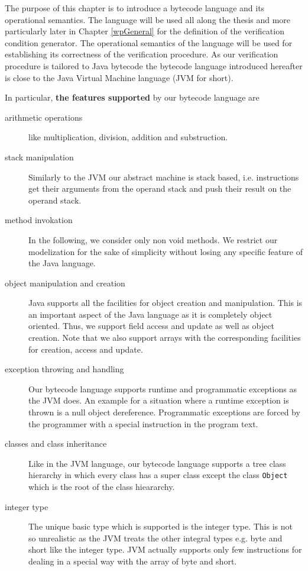 
 The purpose of this chapter is to introduce a bytecode language 
 and its operational semantics. The language will be used all along the thesis and more particularly
  later in Chapter \ref{wpGeneral} for the definition of the verification condition generator.
 The operational semantics of the language will be used 
 for establishing  its correctness of the verification procedure.
 As our verification procedure is tailored to Java bytecode 
 the bytecode language introduced hereafter is close to the Java Virtual Machine 
 language \cite{VMSpec}(JVM for short). 
 
In particular, \textbf{the features supported} by our bytecode language are 
\begin{description} 
   \item  [arithmetic operations] like multiplication, division, addition and substruction. 

   \item  [stack manipulation] Similarly to the JVM  our abstract machine is stack based, i.e. instructions
          get their arguments from the operand stack and push their result on the  operand stack.

   \item  [method invokation] In the following, we consider only  non void methods. 
          We restrict our modelization for the sake of simplicity without losing any specific feature of the Java language.
          
   \item  [object manipulation and creation] 
          Java supports all the facilities for object creation and manipulation.
	  This is an important aspect of the Java language as it is completely object oriented.
	  Thus, we support field access and update as well as object creation. Note that we also 
	  support arrays with the corresponding facilities for creation, access and update. 

   \item  [exception throwing and handling] Our bytecode language supports runtime and programmatic exceptions as the JVM does.
	  An example for a situation where a runtime exception is thrown is a null object dereference.  Programmatic exceptions
	  are forced by the programmer with a special instruction in the program text.
   
   \item  [classes and class inheritance] Like in the JVM language, our bytecode language supports  a tree class hierarchy in which every class 
          has a super class except the class \texttt{Object} which is the root of the class hieararchy.

   \item  [integer type] The unique basic type which is supported is the integer type.
          This is not so unrealistic as the JVM
	  treats the other integral types e.g. byte and short like the integer type. 
	  JVM actually supports only few instructions 
          for dealing in a special way with the array of byte and short.
	  
\end{description} 
 

